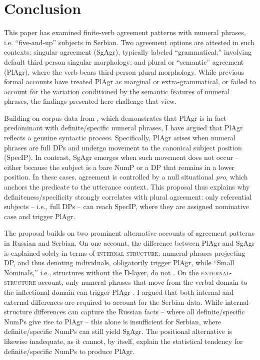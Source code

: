 \documentclass[output=paper,colorlinks,citecolor=brown
]{langscibook}
\begin{document}
\section{Conclusion}\label{sect:conclusion}

This paper has examined finite-verb agreement patterns with numeral phrases, i.e. ``five-and-up'' subjects in Serbian. Two agreement options are attested in such contexts: singular agreement (SgAgr), typically labeled ``grammatical,'' involving default third-person singular morphology; and plural or ``semantic'' agreement (PlAgr), where the verb bears third-person plural morphology. While previous formal accounts have treated PlAgr as marginal or extra-grammatical, or failed to account for the variation conditioned by the semantic features of numeral phrases, the findings presented here challenge that view.

Building on corpus data from \citet{Milosavljevic2017}, which demonstrates that PlAgr is in fact predominant with definite/specific numeral phrases, I have argued that PlAgr reflects a genuine syntactic process. Specifically, PlAgr arises when numeral phrases are full DPs and undergo movement to the canonical subject position (SpecIP). In contrast, SgAgr emerges when such movement does not occur -- either because the subject is a bare NumP or a DP that remains in a lower position. In these cases, agreement is controlled by a null situational \textit{pro}, which anchors the predicate to the utterance context. This proposal thus explains why definiteness/specificity strongly correlates with plural agreement: only referential subjects -- i.e., full DPs -- can reach SpecIP, where they are assigned nominative case and trigger PlAgr. 

The proposal builds on two prominent alternative accounts of agreement patterns in Russian and Serbian. On one account, the difference between PlAgr and SgAgr is explained solely in terms of \textsc{internal structure}: numeral phrases projecting DP, and thus denoting individuals, obligatorily trigger PlAgr, while ``Small Nominals,'' i.e., structures without the D-layer, do not \citep{Pereltsvaig2006}. On the \textsc{external-structure} account, only numeral phrases that move from the verbal domain to the inflectional domain can trigger PlAgr \citep{Boskovic2008}. I argued that both internal and external differences are required to account for the Serbian data. While internal-structure differences can capture the Russian facts -- where all definite/specific NumPs give rise to PlAgr -- this alone is insufficient for Serbian, where definite/specific NumPs can still yield SgAgr. The positional alternative is likewise inadequate, as it cannot, by itself, explain the statistical tendency for definite/specific NumPs to produce PlAgr.
\end{document}
